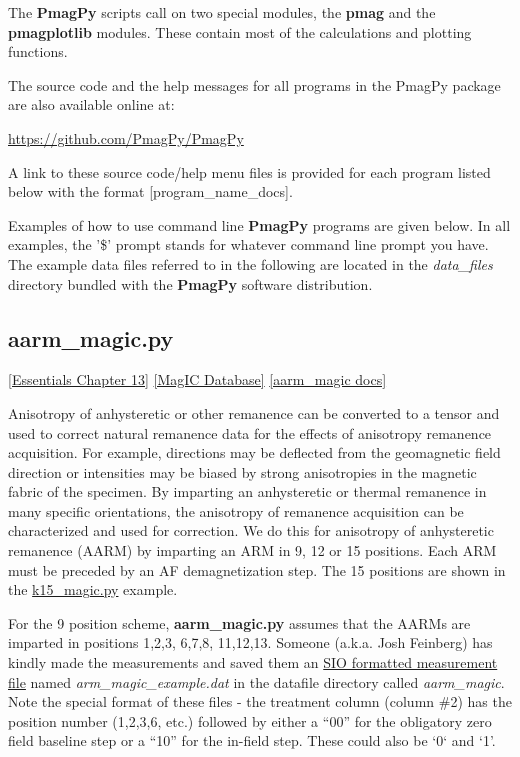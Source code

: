 \documentclass[11pt]{book}
\begin{document}
{{ The {\bf PmagPy} scripts call on two special modules, the {\bf pmag} and the {\bf pmagplotlib} modules.  These contain most of the calculations and plotting functions.

 The source code and the help messages for all programs in the PmagPy package are also available online at:


 \url{https://github.com/PmagPy/PmagPy}

A link to these source code/help menu files is provided for each program listed below with the format [program\_name\_docs].

Examples of how to use command line {\bf PmagPy} programs are given below. In all examples, the '\$' prompt stands for whatever command line prompt you have. The example data files referred to in the following are located in the {\it data\_files} directory bundled with the {\bf PmagPy} software distribution.


\subsection{aarm\_magic.py}
 \href{http://earthref.org/MAGIC/books/Tauxe/Essentials/WebBook3ch13.html#ch13}{[Essentials Chapter 13]}
\href{#MagICDatabase}{[MagIC Database]}
\href{https://github.com/PmagPy/PmagPy/blob/master/programs/aarm_magic.py}{[aarm\_magic docs]}

Anisotropy of anhysteretic or other remanence can be converted to a tensor and used to correct natural remanence data for the effects of anisotropy remanence acquisition.  For example, directions may be deflected from the geomagnetic field direction or intensities may be biased by strong anisotropies in the magnetic fabric of the specimen.  By imparting an anhysteretic or thermal remanence in many specific orientations, the anisotropy of remanence acquisition can be characterized and used for correction.   We do this for anisotropy of anhysteretic remanence (AARM) by imparting an ARM in 9, 12  or 15 positions.  Each ARM must be preceded by an AF demagnetization step.    The 15 positions are shown in the \href{#k15_magic.py}{k15\_magic.py} example.




 For the 9 position scheme,  {\bf aarm\_magic.py} assumes that the AARMs are imparted in positions 1,2,3, 6,7,8, 11,12,13.    Someone (a.k.a. Josh Feinberg) has kindly made the measurements and saved them an \href{#sio_magic.py}{SIO formatted measurement file} named {\it arm\_magic\_example.dat} in the datafile directory called {\it aarm\_magic}.   Note the special format of these files - the treatment column (column \#2) has the position number (1,2,3,6, etc.) followed by either a ``00'' for the obligatory zero field baseline step or a ``10'' for the in-field step.  These could also be `0` and `1'.

}}
\end{document}
